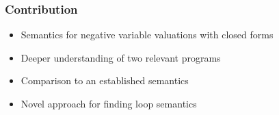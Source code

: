 \begin{frame}
	\frametitle{Contribution}
	\begin{itemize}%
		\itemspacing{20pt}
		\item Semantics for negative variable valuations with closed forms
		\item Deeper understanding of two relevant programs
		\item Comparison to an established semantics
		\item Novel approach for finding loop semantics
	\end{itemize}
\end{frame}
